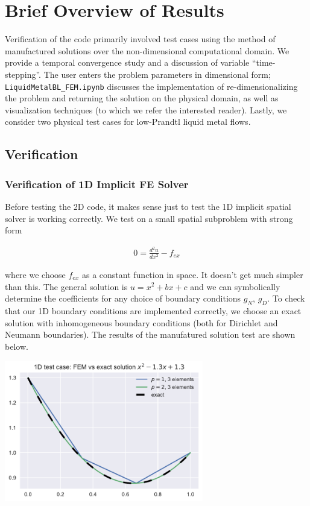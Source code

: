 \documentclass[10pt]{article}
\begin{document}
\section{Brief Overview of Results}

  Verification of the code primarily involved test cases using the method of manufactured solutions
  over the non-dimensional computational domain. We provide a temporal convergence study and a
  discussion of variable ``time-stepping''.  The user enters the problem parameters in dimensional
  form; \texttt{LiquidMetalBL\_FEM.ipynb} discusses the implementation of re-dimensionalizing the problem
  and returning the solution on the physical domain, as well as visualization techniques (to which
  we refer the interested reader). Lastly, we consider two physical test cases for low-Prandtl
  liquid metal flows.

  \subsection{Verification}
  \subsubsection{Verification of 1D Implicit FE Solver}

  Before testing the 2D code, it makes sense just to test the 1D implicit spatial solver is working
  correctly.  We test on a small spatial subproblem with strong form

  \begin{align}
    0= \frac{d^2 u}{dx^2} - f_{ex}
  \end{align}

  where we choose $f_{ex}$ as a constant function in space. It doesn't get much simpler than this.
  The general solution is $u = x^2 + bx + c$ and we can symbolically determine the coefficients for
  any choice of boundary conditions $g_N,\, g_D$.  To check that our 1D boundary conditions are
  implemented correctly, we choose an exact solution with inhomogeneous boundary conditions (both
  for Dirichlet and Neumann boundaries).  The results of the manufatured solution test are shown
  below. \\
  
  \centerline{\includegraphics[width=0.65\textwidth]{img/1D_test.pdf}}
\end{document}
